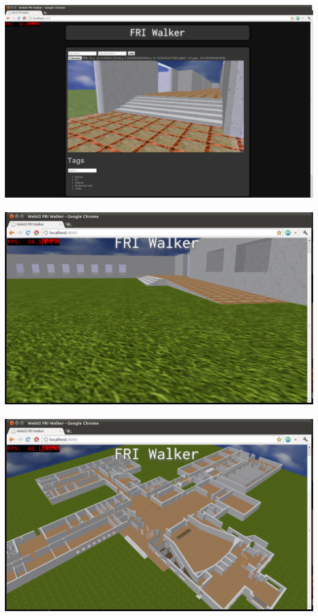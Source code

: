 \documentclass[10pt,a4paper]{article}
\begin{document}
\ \\
\includegraphics[scale=0.3]{screen4.png}\\
\ \\
\includegraphics[scale=0.4]{screen5.png}\\ 
\ \\
\includegraphics[scale=0.4]{screen6.png}\\ 
\end{document}

